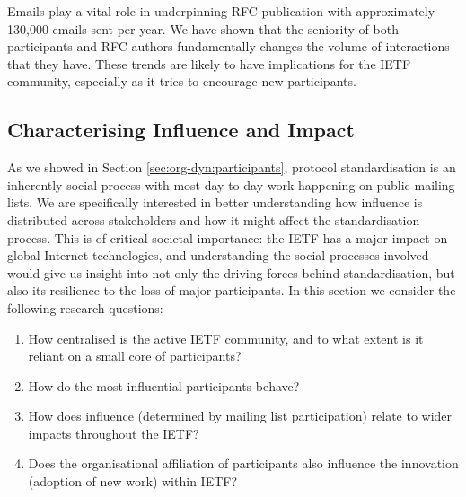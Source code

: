 \documentclass[twocolumn,10pt]{article}
\newcommand{\pb}[1]{\vspace{0.75ex}\noindent{\textbf{#1}}}
\begin{document}
\pb{Summary:}
Emails play a vital role in underpinning RFC publication with approximately
130,000 emails sent per year. We have shown that the seniority of both
participants and RFC authors fundamentally changes the volume of
interactions that they have. These trends are likely to have implications
for the IETF community, especially as it tries to encourage new
participants.


\subsection{Characterising Influence and Impact}
\label{sec:org-dyn:influence}



As we showed in Section \ref{sec:org-dyn:participants}, protocol
standardisation is an inherently social process with most day-to-day work
happening on public mailing lists.  We are specifically
interested in better understanding how influence is distributed across
stakeholders and how it might affect the standardisation process.  This is
of critical societal importance: the IETF has a major impact on global
Internet technologies, and understanding the social processes involved
would give us insight into not only the driving forces behind
standardisation, but also its resilience to the loss of major participants.
In this section we consider the following research questions: 
\begin{enumerate}
  \item How centralised is the active IETF community, and to what extent
    is it reliant on a small core of participants? 
  \item How do the most influential participants behave? 
  \item How does influence (determined by mailing list participation)
    relate to wider impacts throughout the IETF?
  \item Does the organisational affiliation of participants also
    influence the innovation (adoption of new work) within IETF?
\end{enumerate}
\end{document}
